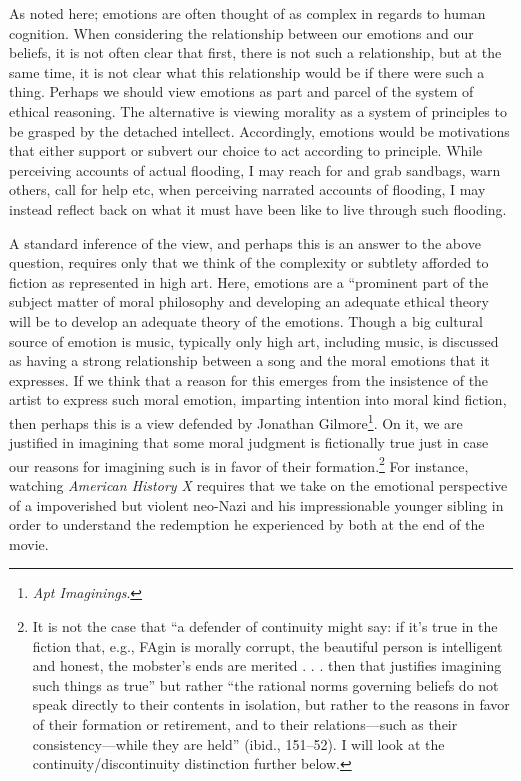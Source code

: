 \documentclass[phdthesis,12pt,final]{wuthesis}
\theoremstyle{definition}
\theoremstyle{definition}
\theoremstyle{definition}
\theoremstyle{definition}
\theoremstyle{remark}
\begin{document}
As noted here; emotions are often thought of as complex in regards to human cognition. When considering the relationship between our emotions and our beliefs, it is not often clear that first, there is not such a relationship, but at the same time, it is not clear what this relationship would be if there were such a thing. Perhaps we should view emotions as part and parcel of the system of ethical reasoning. The alternative is viewing morality as a system of principles to be grasped by the detached intellect. Accordingly, emotions would be motivations that either support or subvert our choice to act according to principle. While perceiving accounts of actual flooding, I may reach for and grab sandbags, warn others, call for help etc, when perceiving narrated accounts of flooding, I may instead reflect back on what it must have been like to live through such flooding.

A standard inference of the view, and perhaps this is an answer to the above question, requires only that we think of the complexity or subtlety afforded to fiction as represented in high art. Here, emotions are a ``prominent part of the subject matter of moral philosophy and developing an adequate ethical theory will be to develop an adequate theory of the emotions. Though a big cultural source of emotion is music, typically only high art, including music, is discussed as having a strong relationship between a song and the moral emotions that it expresses. If we think that a reason for this emerges from the insistence of the artist to express such moral emotion, imparting intention into moral kind fiction, then perhaps this is a view defended by Jonathan Gilmore\footnote{\emph{Apt {Imaginings}}.}. On it, we are justified in imagining that some moral judgment is fictionally true just in case our reasons for imagining such is in favor of their formation.\footnote{It is not the case that ``a defender of continuity might say: if it's true in the fiction that, e.g., FAgin is morally corrupt, the beautiful person is intelligent and honest, the mobster's ends are merited . . . then that justifies imagining such things as true'' but rather ``the rational norms governing beliefs do not speak directly to their contents in isolation, but rather to the reasons in favor of their formation or retirement, and to their relations---such as their consistency---while they are held'' (ibid., 151--52). I will look at the continuity/discontinuity distinction further below.} For instance, watching \emph{American History X} requires that we take on the emotional perspective of a impoverished but violent neo-Nazi and his impressionable younger sibling in order to understand the redemption he experienced by both at the end of the movie.
\end{document}
